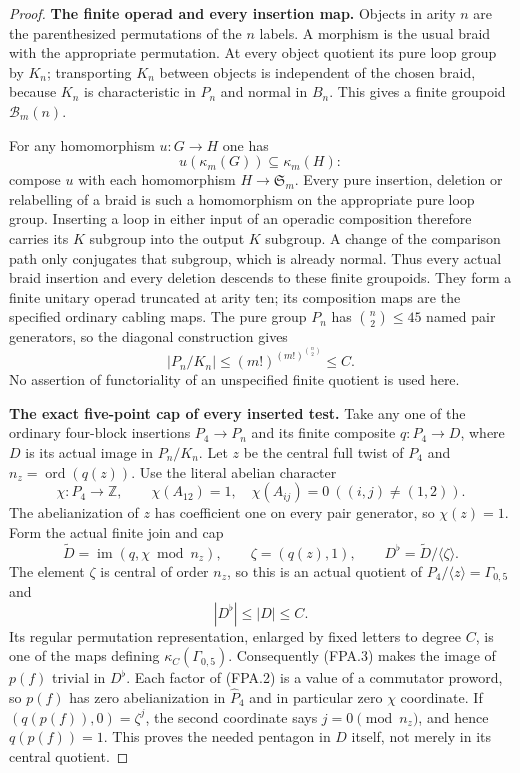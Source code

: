\begin{proof}
\par\medskip\noindent\textbf{The finite operad and every insertion map.}\quad
Objects in arity $n$ are the parenthesized permutations
of the $n$ labels.  A morphism is the usual braid with
the appropriate permutation.  At every object quotient
its pure loop group by $K_n$; transporting $K_n$ between
objects is independent of the chosen braid, because
$K_n$ is characteristic in $P_n$ and normal in $B_n$.
This gives a finite groupoid $\mathcal B_m(n)$.

For any homomorphism $u:G\to H$ one has
\[
                     u(\kappa_m(G))\subseteq\kappa_m(H):
                                                               \tag{FPA.5}
\]
compose $u$ with each homomorphism $H\to\mathfrak S_m$.
Every pure insertion, deletion or relabelling of a braid
is such a homomorphism on the appropriate pure loop
group.  Inserting a loop in either input of an operadic
composition therefore carries its $K$ subgroup into the
output $K$ subgroup.  A change of the comparison path
only conjugates that subgroup, which is already normal.
Thus every actual braid insertion and every deletion
descends to these finite groupoids.  They form a
finite unitary operad truncated at arity ten; its
composition maps are the specified ordinary cabling maps.
The pure group $P_n$ has $\binom n2\leq45$ named pair
generators, so the diagonal construction gives
\[
               |P_n/K_n|\leq(m!)^{(m!)^{\binom n2}}\leq C.
                                                               \tag{FPA.6}
\]
No assertion of functoriality of an unspecified finite
quotient is used here.

\par\medskip\noindent\textbf{The exact five-point cap of every inserted test.}\quad
Take any one of the ordinary four-block insertions
$P_4\to P_n$ and its finite composite $q:P_4\to D$,
where $D$ is its actual image in $P_n/K_n$.
Let $z$ be the central full twist of $P_4$ and
$n_z=\operatorname{ord}(q(z))$.
Use the literal abelian character
\[
 \chi:P_4\longrightarrow\mathbb Z,\qquad
 \chi(A_{12})=1,\quad\chi(A_{ij})=0\ ((i,j)\ne(1,2)).
                                                               \tag{FPA.7}
\]
The abelianization of $z$ has coefficient one on every
pair generator, so $\chi(z)=1$.
Form the actual finite join and cap
\[
 \widetilde D=\operatorname{im}(q,\chi\bmod n_z),\qquad
 \zeta=(q(z),1),\qquad D^\flat=\widetilde D/\langle\zeta\rangle.
                                                               \tag{FPA.8}
\]
The element $\zeta$ is central of order $n_z$, so this
is an actual quotient of $P_4/\langle z\rangle=\Gamma_{0,5}$
and
\[
                    |D^\flat|\leq |D|\leq C.           \tag{FPA.9}
\]
Its regular permutation representation, enlarged by fixed
letters to degree $C$, is one of the maps defining
$\kappa_C(\Gamma_{0,5})$.
Consequently (FPA.3) makes the image of $p(f)$ trivial
in $D^\flat$.
Each factor of (FPA.2) is a value of a commutator proword,
so $p(f)$ has zero abelianization in $\widehat P_4$ and
in particular zero $\chi$ coordinate.
If $(q(p(f)),0)=\zeta^j$, the second coordinate says
$j=0\pmod{n_z}$, and hence $q(p(f))=1$.
This proves the needed pentagon in $D$ itself, not merely
in its central quotient.


\end{proof}

